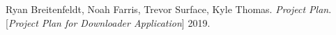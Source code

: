 \documentclass{article}
\begin{document}
    \newpage
    \begin{thebibliography}{1}
    Ryan Breitenfeldt, Noah Farris, Trevor Surface, Kyle Thomas.
    \textit{Project Plan}.
    [\textit{Project Plan for Downloader Application}] 2019.
    \end{thebibliography}



\end{document}
